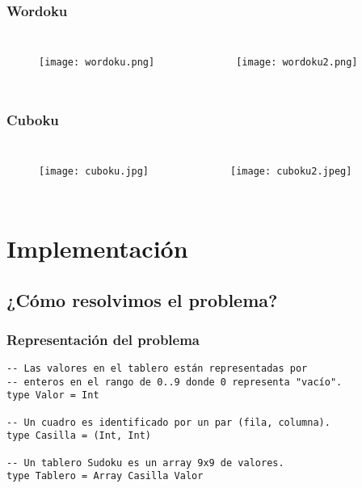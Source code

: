 \documentclass{beamer}
\begin{document}

\begin{frame}
\frametitle{Wordoku}
\begin{columns}[c] %

\begin{figure}[H]
  \centering
  \texttt{[image: wordoku.png]}
\end{figure}

\begin{figure}[H]
  \centering
  \texttt{[image: wordoku2.png]}
\end{figure}
\end{columns}
\end{frame}


\begin{frame}
\frametitle{Cuboku}
\begin{columns}[c] %

\begin{figure}[H]
  \centering
  \texttt{[image: cuboku.jpg]}
\end{figure}

\begin{figure}[H]
  \centering
  \texttt{[image: cuboku2.jpeg]}
\end{figure}
\end{columns}
\end{frame}

\section{Implementación}

\subsection{¿Cómo resolvimos el problema?}

\begin{frame}[fragile]
\frametitle{Representación del problema}
\begin{verbatim}
-- Las valores en el tablero están representadas por
-- enteros en el rango de 0..9 donde 0 representa "vacío".
type Valor = Int

-- Un cuadro es identificado por un par (fila, columna).
type Casilla = (Int, Int)

-- Un tablero Sudoku es un array 9x9 de valores.
type Tablero = Array Casilla Valor
\end{verbatim}
\end{frame}
\end{document}
